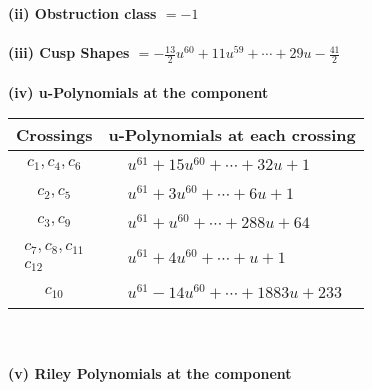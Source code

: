\documentclass[1p]{elsarticle_modified}
\theoremstyle{definition}
\begin{document}
\flushleft \textbf{(ii) Obstruction class $= -1$}\\~\\
\flushleft \textbf{(iii) Cusp Shapes $= -\frac{13}{2} u^{60}+11 u^{59}+\cdots+29 u-\frac{41}{2}$}\\~\\
\newpage\renewcommand{\arraystretch}{1}
\flushleft \textbf{(iv) u-Polynomials at the component}\newline \\
\begin{tabular}{m{50pt}|m{274pt}}
Crossings & \hspace{64pt}u-Polynomials at each crossing \\
\hline $$\begin{aligned}c_{1},c_{4},c_{6}\end{aligned}$$&$\begin{aligned}
&u^{61}+15 u^{60}+\cdots+32 u+1
\end{aligned}$\\
\hline $$\begin{aligned}c_{2},c_{5}\end{aligned}$$&$\begin{aligned}
&u^{61}+3 u^{60}+\cdots+6 u+1
\end{aligned}$\\
\hline $$\begin{aligned}c_{3},c_{9}\end{aligned}$$&$\begin{aligned}
&u^{61}+u^{60}+\cdots+288 u+64
\end{aligned}$\\
\hline $$\begin{aligned}c_{7},c_{8},c_{11}\\c_{12}\end{aligned}$$&$\begin{aligned}
&u^{61}+4 u^{60}+\cdots+u+1
\end{aligned}$\\
\hline $$\begin{aligned}c_{10}\end{aligned}$$&$\begin{aligned}
&u^{61}-14 u^{60}+\cdots+1883 u+233
\end{aligned}$\\
\hline
\end{tabular}\\~\\
\newpage\renewcommand{\arraystretch}{1}
\flushleft \textbf{(v) Riley Polynomials at the component}\newline \\
\end{document}
